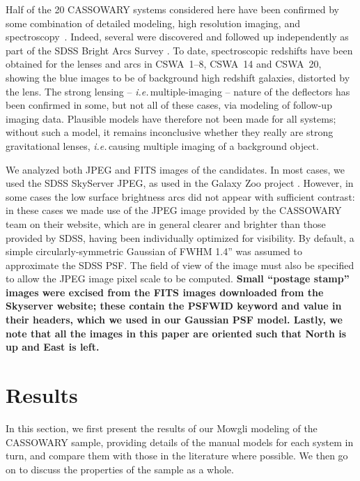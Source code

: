 \documentclass[iop]{emulateapj}
\def\eg{{\it e.g.}\,}
\def\ie{{\it i.e.}\,}
\def\theapplet{{\sc Mowgli}\xspace}
\def\NEW#1{{\bf{#1}}}
\begin{document}
Half of the 20 
CASSOWARY systems considered here have been confirmed by some combination of
detailed modeling, high resolution imaging, and
spectroscopy~\citep{Bel++07,Bel++09,Pet++10}.  Indeed, several were discovered
and followed up independently as part of the SDSS Bright Arcs Survey
\citep[\eg][]{Lin++09,Die++09,Kub++09,Kub++10}.  To date, spectroscopic
redshifts have been obtained for the lenses and arcs in CSWA~1--8, CSWA~14 and
CSWA~20,  showing the blue images to be of background high redshift galaxies,
distorted by the lens. The strong lensing -- \ie multiple-imaging -- nature of
the deflectors has been confirmed in some, but not all  of these cases, via
modeling of  follow-up imaging data. Plausible models have therefore  not been
made for all systems; without such a model, it remains inconclusive whether they
really are strong gravitational lenses, \ie causing multiple imaging of a
background object. 

We analyzed both JPEG and FITS images of the candidates.   In most cases, we
used the SDSS SkyServer JPEG, as used in the Galaxy Zoo project \citep{gz1}.
However, in some cases the low surface brightness arcs did not appear with
sufficient contrast: in these cases we made use of the JPEG image provided by
the CASSOWARY team on their website,  which are in general clearer and
brighter than those provided by SDSS, having been individually optimized for
visibility. By default, a simple circularly-symmetric Gaussian of FWHM 1.4''
was assumed to approximate the SDSS PSF. The field of view of the image must
also be specified to allow the JPEG image pixel scale to be computed.
\NEW{Small ``postage stamp'' images were excised from the FITS images
downloaded from the Skyserver website; these contain the PSFWID keyword and
value in their headers, which we used in our Gaussian PSF model.  Lastly, we
note that all the images in this paper are oriented such that North is up and
East is left.}



\section{Results}
\label{sec:results}

In this section, we first present the results of our \theapplet modeling of the
CASSOWARY sample, providing details of the manual models for each system in
turn, and compare them with those in the literature where possible. We then 
go on to discuss the properties of the sample as a whole.
\end{document}
